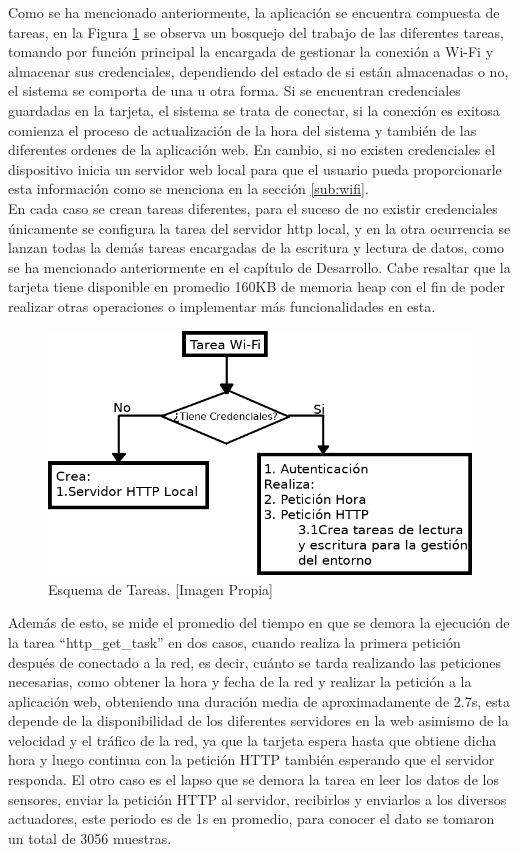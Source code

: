 Como se ha mencionado anteriormente, la aplicación se encuentra compuesta de tareas, en la Figura \ref{fig:tareas} se observa un bosquejo del trabajo de las diferentes tareas, tomando por función principal la encargada de gestionar la conexión a Wi-Fi y almacenar sus credenciales, dependiendo del estado de si están almacenadas o no, el sistema se comporta de una u otra forma. Si se encuentran credenciales guardadas en la tarjeta, el sistema se trata de conectar, si la conexión es exitosa comienza el proceso de actualización de la hora del sistema y también de las diferentes ordenes de la aplicación web. En cambio, si no existen credenciales el dispositivo inicia un servidor web local para que el usuario pueda proporcionarle esta información como se menciona en la sección \ref{sub:wifi}.\\

En cada caso se crean tareas diferentes, para el suceso de no existir credenciales únicamente se configura la tarea del servidor http local, y en la otra ocurrencia se lanzan todas la demás tareas encargadas de la escritura y lectura de datos, como se ha mencionado anteriormente en el capítulo de Desarrollo. Cabe resaltar que la tarjeta tiene disponible en promedio 160KB de memoria heap con el fin de poder realizar otras operaciones o implementar más funcionalidades en esta.\\

\begin{figure}[!t]
	\centering
	\caption[Esquema de Tareas.]{Esquema de Tareas. [Imagen Propia]}
	\label{fig:tareas}
	\includegraphics[width=0.7\linewidth]{Imagenes/tareas}
\end{figure}

Además de esto, se mide el promedio del tiempo en que se demora la ejecución de la tarea ``http\_get\_task'' en dos casos, cuando realiza la primera petición después de conectado a la red, es decir, cuánto se tarda realizando las peticiones necesarias, como obtener la hora y fecha de la red y realizar la petición a la aplicación web, obteniendo una duración media de aproximadamente de 2.7s, esta depende de la disponibilidad de los diferentes servidores en la web asimismo de la velocidad y el tráfico de la red, ya que la tarjeta espera hasta que obtiene dicha hora y luego continua con la petición HTTP también esperando que el servidor responda. El otro caso es el lapso que se demora la tarea en leer los datos de los sensores, enviar la petición HTTP al servidor, recibirlos y enviarlos a los diversos actuadores, este periodo es de 1s en promedio, para conocer el dato se tomaron un total de 3056 muestras.

